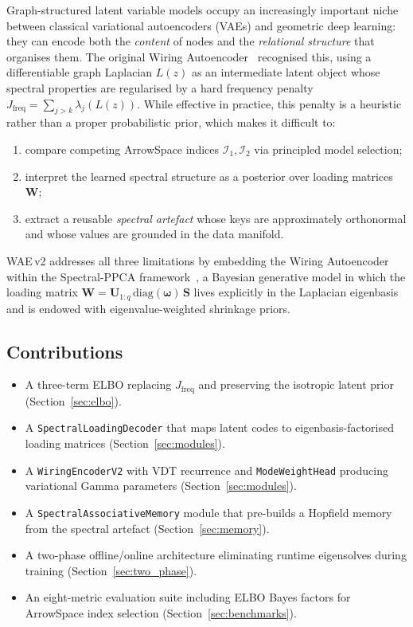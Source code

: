 \documentclass[11pt,a4paper]{article}
\newcommand{\I}{\mathcal{I}}
\newcommand{\diag}{\mathrm{diag}}
\newcommand{\bU}{\bm{U}}
\newcommand{\bS}{\bm{S}}
\newcommand{\bW}{\bm{W}}
\newcommand{\bomega}{\bm{\omega}}
\begin{document}
Graph-structured latent variable models occupy an increasingly important niche
between classical variational autoencoders (VAEs) and geometric deep learning:
they can encode both the \emph{content} of nodes and the \emph{relational
structure} that organises them.  The original Wiring Autoencoder~\citep{wae_v1}
recognised this, using a differentiable graph Laplacian $L(z)$ as an
intermediate latent object whose spectral properties are regularised by a hard
frequency penalty $J_{\mathrm{freq}} = \sum_{j>k}\lambda_j(L(z))$.  While
effective in practice, this penalty is a heuristic rather than a proper
probabilistic prior, which makes it difficult to:
\begin{enumerate}
  \item compare competing ArrowSpace indices $\I_1, \I_2$ via principled model
        selection;
  \item interpret the learned spectral structure as a posterior over loading
        matrices $\bW$;
  \item extract a reusable \emph{spectral artefact} whose keys are
        approximately orthonormal and whose values are grounded in the data
        manifold.
\end{enumerate}

WAE\,v2 addresses all three limitations by embedding the Wiring Autoencoder
within the Spectral-PPCA framework~\citep{design_a}, a Bayesian generative
model in which the loading matrix $\bW = \bU_{1:q}\,\diag(\bomega)\,\bS$
lives explicitly in the Laplacian eigenbasis and is endowed with
eigenvalue-weighted shrinkage priors.

\subsection{Contributions}
\begin{itemize}
  \item A three-term ELBO replacing $J_{\mathrm{freq}}$ and preserving the
        isotropic latent prior (Section~\ref{sec:elbo}).
  \item A \texttt{SpectralLoadingDecoder} that maps latent codes to
        eigenbasis-factorised loading matrices (Section~\ref{sec:modules}).
  \item A \texttt{WiringEncoderV2} with VDT recurrence and
        \texttt{ModeWeightHead} producing variational Gamma parameters
        (Section~\ref{sec:modules}).
  \item A \texttt{SpectralAssociativeMemory} module that pre-builds a Hopfield
        memory from the spectral artefact (Section~\ref{sec:memory}).
  \item A two-phase offline/online architecture eliminating runtime
        eigensolves during training (Section~\ref{sec:two_phase}).
  \item An eight-metric evaluation suite including ELBO Bayes factors for
        ArrowSpace index selection (Section~\ref{sec:benchmarks}).
\end{itemize}
\end{document}
